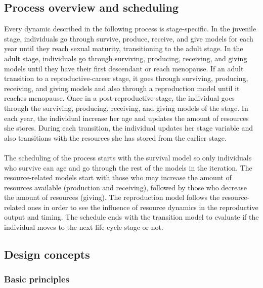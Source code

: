 \documentclass{article}
\begin{document}
\subsection{Process overview and scheduling}

Every dynamic described in the following process is stage-specific. In the juvenile stage, individuals go through survive, produce, receive, and give models for each year until they reach sexual maturity, transitioning to the adult stage. In the adult stage, individuals go through surviving, producing, receiving, and giving models until they have their first descendant or reach menopause. If an adult transition to a reproductive-career stage, it goes through surviving, producing, receiving, and giving models and also through a reproduction model until it reaches menopause. Once in a post-reproductive stage, the individual goes through the surviving, producing, receiving, and giving models of the stage. In each year, the individual increase her age and updates the amount of resources she stores. During each transition, the individual updates her stage variable and also transitions with the resources she has stored from the earlier stage.
\\\\
The scheduling of the process starts with the survival model so only individuals who survive can age and go through the rest of the models in the iteration. The resource-related models start with those who may increase the amount of resources available (production and receiving), followed by those who decrease the amount of resources (giving). The reproduction model follows the resource-related ones in order to see the influence of resource dynamics in the reproductive output and timing. The schedule ends with the transition model to evaluate if the individual moves to the next life cycle stage or not.

\subsection{Design concepts}

\subsubsection{Basic principles}
\end{document}
